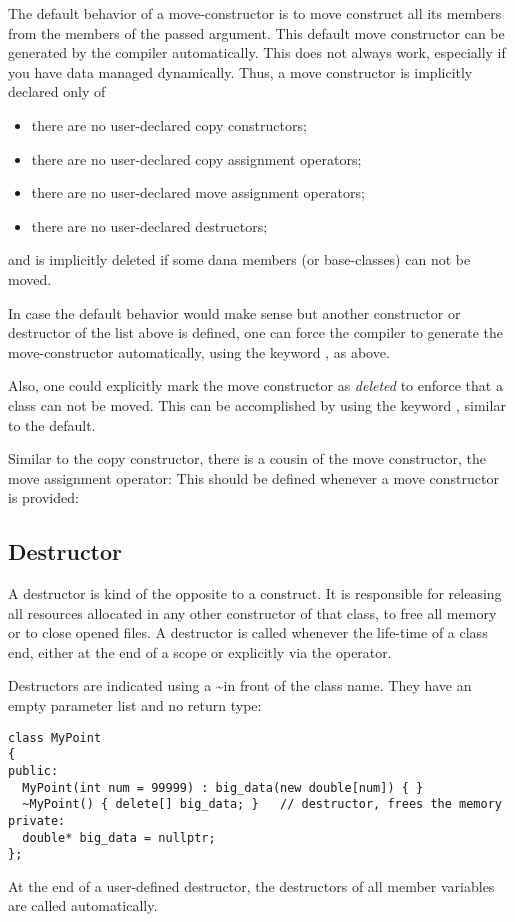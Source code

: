 The default behavior of a move-constructor is to move construct all its members from the members of the passed argument. This default move constructor
can be generated by the compiler automatically. This does not always work, especially if you have data managed dynamically. Thus, a move constructor is
implicitly declared only of
\begin{itemize}
  \item there are no user-declared copy constructors;
  \item there are no user-declared copy assignment operators;
  \item there are no user-declared move assignment operators;
  \item there are no user-declared destructors;
\end{itemize}

and is implicitly deleted if some dana members (or base-classes) can not be moved.

In case the default behavior would make sense but another constructor or destructor of the list above is defined, one can force the compiler to generate
the move-constructor automatically, using the keyword , as above.

Also, one could explicitly mark the move constructor as \emph{deleted} to enforce that a class can not be moved. This can be accomplished by using the
keyword , similar to the default.

Similar to the copy constructor, there is a cousin of the move constructor, the move assignment operator: This should be defined whenever a move constructor
is provided:


\subsection{Destructor\label{sec:destructor}}
A destructor is kind of the opposite to a construct. It is responsible for releasing all resources allocated in any other constructor of that class, \eg
to free all memory or to close opened files. A destructor is called whenever the life-time of a class end, either at the end of a scope or explicitly via
the  operator.

Destructors are indicated using a \textasciitilde in front of the class name. They have an empty parameter list and no return type:
%
\begin{verbatim}
class MyPoint
{
public:
  MyPoint(int num = 99999) : big_data(new double[num]) { }
  ~MyPoint() { delete[] big_data; }   // destructor, frees the memory
private:
  double* big_data = nullptr;
};
\end{verbatim}
At the end of a user-defined destructor, the destructors of all member variables are called automatically.

